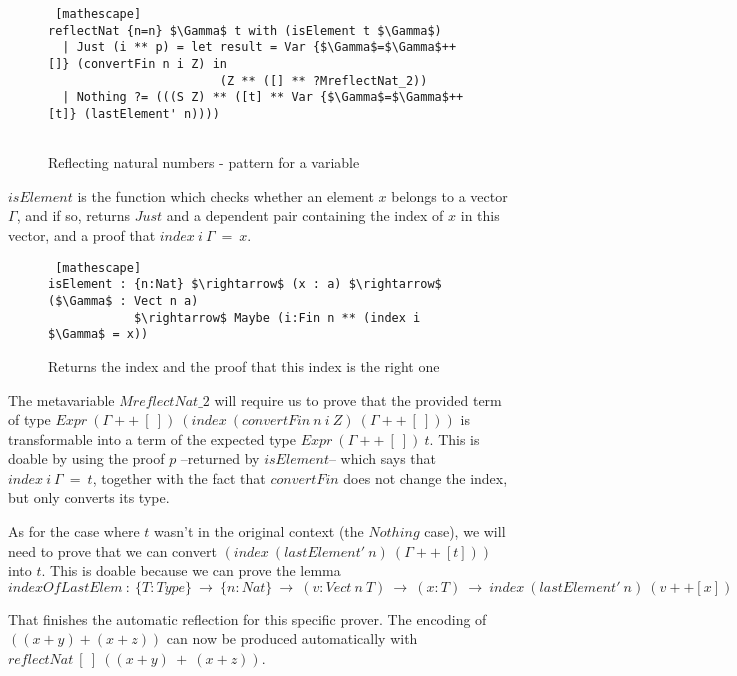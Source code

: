  \begin{figure}[H]
\figrule
\begin{center}
\begin{lstlisting} [mathescape]
reflectNat {n=n} $\Gamma$ t with (isElement t $\Gamma$)
  | Just (i ** p) = let result = Var {$\Gamma$=$\Gamma$++[]} (convertFin n i Z) in
                        (Z ** ([] ** ?MreflectNat_2))
  | Nothing ?= (((S Z) ** ([t] ** Var {$\Gamma$=$\Gamma$++[t]} (lastElement' n))))  
            
\end{lstlisting}
\end{center}
\caption{Reflecting natural numbers - pattern for a variable}
\label{reflectNat_pattern3}
\figrule
\end{figure}

$isElement$ is the function which checks whether an element $x$ belongs to a vector $\Gamma$, and if so, returns $Just$ and a dependent pair containing the index of $x$ in this vector, and a proof that $index\ i\ \Gamma\ =\ x$.

 \begin{figure}[H]
\figrule
\begin{center}
\begin{lstlisting} [mathescape]
isElement : {n:Nat} $\rightarrow$ (x : a) $\rightarrow$ ($\Gamma$ : Vect n a) 
            $\rightarrow$ Maybe (i:Fin n ** (index i $\Gamma$ = x))
\end{lstlisting}
\end{center}
\caption{Returns the index and the proof that this index is the right one}
\label{isElement}
\figrule
\end{figure}

The metavariable $MreflectNat\_2$ will require us to prove that the provided term of type $Expr\ (\Gamma ++\ [\ ])\ (index\ (convertFin\ n\ i\ Z)\ (\Gamma ++\ [\ ]))$ is transformable into a term of the expected type $Expr\ (\Gamma ++\ [\ ])\ t$. This is doable by using the proof $p$ --returned by $isElement$-- which says that $index\ i\ \Gamma\ =\ t$, together with the fact that $convertFin$ does not change the index, but only converts its type.

As for the case where $t$ wasn't in the original context (the $Nothing$ case), we will need to prove that we can convert $(index\ (lastElement'\ n)\ (\Gamma ++\ [t]))$ into $t$. This is doable because we can prove the lemma $indexOfLastElem\ :\ \{T:Type\}\ \rightarrow\ \{n:Nat\}\ \rightarrow\ (v:Vect\ n\ T)\ \rightarrow\ (x:T)\ \rightarrow\ index\ (lastElement'\ n)\ (v++[x])\ =\ x$ 	

            
That finishes the automatic reflection for this specific prover. The encoding of $((x+y) + (x+z))$ can now be produced automatically with $reflectNat\ [\ ]\ ((x+y)\ +\ (x+z))$.
            

            
